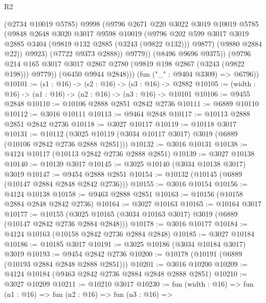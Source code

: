 \begin{lexlean}{R2}
\begin{coremodule}
                    (@2734 @10019 @5785)
                    @9998
                    (@9796
                      @2671
                      @220
                      @3022
                      @3019
                      @10019
                      @5785
                      (@9848
                        @2648
                        @3020
                        @3017
                        @9598
                        @10019
                        (@9796
                          @202
                          @599
                          @3017
                          @3019
                          @2885
                          @3404
                          (@9819 @132 @2885 (@3243 (@9822 @132)))
                          @9877)
                        (@9880 @2884 @22))
                      @9923)
                    (@7722 @9373 @2888))
                  @9779))
              (@8496 @9696 @9375))
            (@9796 @214 @165 @3017 @3017 @2867 @2780 (@9819 @198 @2867 (@3243 (@9822 @198))) @9779))
          (@6450 @9944 @2848)))
      (fun ("_" : @9404 @3309) => @6796))
@10101 := (s1 : @16) -> (s2 : @16) -> (s3 : @16) -> @2882
@10105 := (width : @16) -> (n1 : @16) -> (n2 : @16) -> (n3 : @16) -> @10101
@10106 := @9455 @2848
@10110 := @10106 @2888 @2851 @2842 @2736
@10111 := @6889 @10110
@10112 := @3016 @10111
@10113 := @9464 @2848
@10117 := @10113 @2888 @2851 @2842 @2736
@10118 := @3027 @10117
@10119 := @10118 @3017
@10131 := @10112 (@3025 @10119 (@3034 @10117 @3017) @3019 (@6889 (@10106 @2842 @2736 @2888 @2851)))
@10132 := @3016 @10131
@10138 := @4124 @10117 (@10113 @2842 @2736 @2888 @2851)
@10139 := @3027 @10138
@10140 := @10139 @3017
@10145 := @3025 @10140 (@3034 @10138 @3017) @3019
@10147 := @9454 @2888 @2851
@10154 := @10132 (@10145 (@6889 (@10147 @2884 @2848 @2842 @2736)))
@10155 := @3016 @10154
@10156 := @4124 @10138
@10158 := @9463 @2888 @2851
@10163 := @10156 (@10158 @2884 @2848 @2842 @2736)
@10164 := @3027 @10163
@10165 := @10164 @3017
@10177 := @10155 (@3025 @10165 (@3034 @10163 @3017) @3019 (@6889 (@10147 @2842 @2736 @2884 @2848)))
@10178 := @3016 @10177
@10184 := @4124 @10163 (@10158 @2842 @2736 @2884 @2848)
@10185 := @3027 @10184
@10186 := @10185 @3017
@10191 := @3025 @10186 (@3034 @10184 @3017) @3019
@10193 := @9454 @2842 @2736
@10200 := @10178 (@10191 (@6889 (@10193 @2884 @2848 @2888 @2851)))
@10201 := @3016 @10200
@10209 := @4124 @10184 (@9463 @2842 @2736 @2884 @2848 @2888 @2851)
@10210 := @3027 @10209
@10211 := @10210 @3017
@10230 := fun (width : @16) =>
  fun (n1 : @16) =>
  fun (n2 : @16) =>
  fun (n3 : @16) =>

\end{coremodule}
\end{lexlean}
